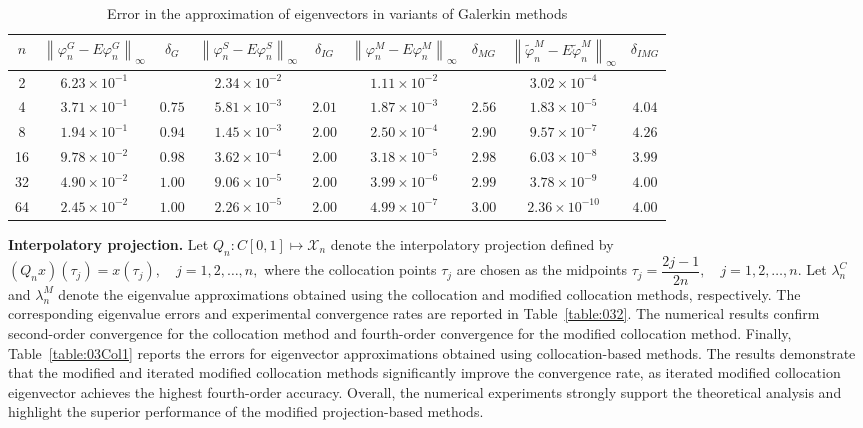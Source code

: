 \documentclass[pdflatex, sn-mathphys-num]{sn-jnl}%
\newcommand{\norm}[1]{\left\lVert #1\right\rVert}
\theoremstyle{thmstyleone}%
\theoremstyle{thmstyletwo}%
\theoremstyle{thmstylethree}%
\begin{document}
\begin{table}[h!]
	\footnotesize
	\centering
		\setlength{\tabcolsep}{4pt}
	\renewcommand{\arraystretch}{1.2}
	\caption{Error in the approximation of eigenvectors in variants of Galerkin methods}
	\label{table:03Gal2}
	\begin{tabular}{|c|cc|cc|cc|cc|}
		\hline
			$n$ & $\norm{\varphi_n^G - E \varphi_n^G }_\infty$ & $\delta_G$ 
		& $\norm{\varphi_n^S- E \varphi_n^S }_\infty$ & $\delta_{IG}$ 
		& $\norm{\varphi_n^M - E \varphi_n^M }_\infty$ & $\delta_{MG}$ 
		& $\norm{\widetilde{\varphi}_n^{M} - E \widetilde{\varphi}_n^{M}}_\infty$ & $\delta_{IMG}$ \\[3.5pt] 
		\hline
		2   & $6.23\times10^{-1}$ &        & $2.34\times10^{-2}$ &        & $1.11\times10^{-2}$ &        & $3.02\times10^{-4}$ &        \\[3.5pt]
		4   & $3.71\times10^{-1}$ & $0.75$ & $5.81\times10^{-3}$ & $2.01$ & $1.87\times10^{-3}$ & $2.56$ & $1.83\times10^{-5}$ & $4.04$ \\[3.5pt]
		8   & $1.94\times10^{-1}$ & $0.94$ & $1.45\times10^{-3}$ & $2.00$ & $2.50\times10^{-4}$ & $2.90$ & $9.57\times10^{-7}$ & $4.26$ \\[3.5pt]
		16  & $9.78\times10^{-2}$ & $0.98$ & $3.62\times10^{-4}$ & $2.00$ & $3.18\times10^{-5}$ & $2.98$ & $6.03\times10^{-8}$ & $3.99$ \\[3.5pt]
		32  & $4.90\times10^{-2}$ & $1.00$ & $9.06\times10^{-5}$ & $2.00$ & $3.99\times10^{-6}$ & $2.99$ & $3.78\times10^{-9}$ & $4.00$ \\[3.5pt]
		64  & $2.45\times10^{-2}$ & $1.00$ & $2.26\times10^{-5}$ & $2.00$ & $4.99\times10^{-7}$ & $3.00$ & $2.36\times10^{-10}$ & $4.00$ \\[3.5pt]
		\hline
	\end{tabular}
\end{table}

\noindent
\textbf{Interpolatory projection.} Let $ Q_n: C [0, 1] \mapsto \mathcal{X}_n$ denote the interpolatory projection defined by
$
(Q_{n}x)(\tau_{j})=x(\tau_{j}), \quad j=1,2,\dots,n,
$
where the collocation points $\tau_{j}$ are chosen as the midpoints
$
\tau_{j}=\dfrac{2j-1}{2n}, \quad j=1,2,\dots,n.
$
Let $\lambda_{n}^{C}$ and $\lambda_{n}^{M}$ denote the eigenvalue approximations obtained using the collocation and modified collocation methods, respectively. The corresponding eigenvalue errors and experimental convergence rates are reported in Table~\ref{table:032}. The numerical results confirm second-order convergence for the collocation method and fourth-order convergence for the modified collocation method.  Finally, Table~\ref{table:03Col1} reports the errors for eigenvector approximations obtained using collocation-based methods. The results demonstrate that the modified and iterated modified collocation methods significantly improve the convergence rate, as iterated modified collocation eigenvector achieves the highest fourth-order accuracy. Overall, the numerical experiments strongly support the theoretical analysis and highlight the superior performance of the modified projection-based methods.
\end{document}
